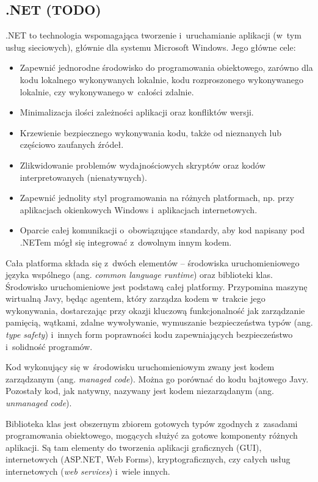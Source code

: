 \subsection{.NET (TODO)}
.NET to technologia wspomagająca tworzenie i~uruchamianie aplikacji (w~tym usług sieciowych), głównie dla systemu Microsoft Windows\cite{dotnetoverview}. Jego główne cele:
\begin{itemize}
	\item Zapewnić jednorodne środowisko do programowania obiektowego, zarówno dla kodu lokalnego wykonywanych lokalnie, kodu rozproszonego wykonywanego lokalnie, czy wykonywanego w~całości zdalnie.
	\item Minimalizacja ilości zależności aplikacji oraz konfliktów wersji.
	\item Krzewienie bezpiecznego wykonywania kodu, także od nieznanych lub częściowo zaufanych źródeł.
	\item Zlikwidowanie problemów wydajnościowych skryptów oraz kodów interpretowanych (nienatywnych).
	\item Zapewnić jednolity styl programowania na różnych platformach, np. przy aplikacjach okienkowych Windows i~aplikacjach internetowych.
	\item Oparcie całej komunikacji o~obowiązujące standardy, aby kod napisany pod .NETem mógł się integrować z~dowolnym innym kodem.
\end{itemize}

Cała platforma składa się z~dwóch elementów -- środowiska uruchomieniowego języka wspólnego (ang. \emph{common language runtime}) oraz biblioteki klas. Środowisko uruchomieniowe jest podstawą całej platformy. Przypomina maszynę wirtualną Javy, będąc agentem, który zarządza kodem w~trakcie jego wykonywania, dostarczając przy okazji kluczową funkcjonalność jak zarządzanie pamięcią, wątkami, zdalne wywoływanie, wymuszanie bezpieczeństwa typów (ang. \emph{type safety}) i~innych form poprawności kodu zapewniających bezpieczeństwo i~solidność programów.

Kod wykonujący się w~środowisku uruchomieniowym zwany jest kodem zarządzanym (ang. \emph{managed code}). Można go porównać do kodu bajtowego Javy. Pozostały kod, jak natywny, nazywany jest kodem niezarządanym (ang. \emph{unmanaged code}).

Biblioteka klas jest obszernym zbiorem gotowych typów zgodnych z~zasadami programowania obiektowego, mogących służyć za gotowe komponenty różnych aplikacji. Są tam elementy do tworzenia aplikacji graficznych (GUI), internetowych (ASP.NET, Web Forms), kryptograficznych, czy całych usług internetowych (\emph{web services}) i~wiele innych.

